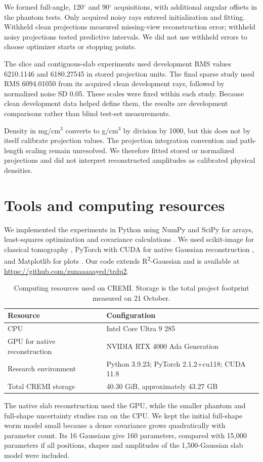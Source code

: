 \documentclass[11pt,a4paper]{article}
\newcommand{\Rtwo}{R\textsuperscript{2}-Gaussian}
\newcommand{\degree}{\ensuremath{^{\circ}}}
\begin{document}
We formed full-angle, 120\degree{} and 90\degree{} acquisitions, with additional angular offsets in the phantom tests. Only acquired noisy rays entered initialization and fitting. Withheld clean projections measured missing-view reconstruction error; withheld noisy projections tested predictive intervals. We did not use withheld errors to choose optimizer starts or stopping points.

The slice and contiguous-slab experiments used development RMS values 6210.1146 and 6180.27545 in stored projection units. The final sparse study used RMS 6094.01050 from its acquired clean development rays, followed by normalized noise SD 0.05. These scales were fixed within each study. Because clean development data helped define them, the results are development comparisons rather than blind test-set measurements.

Density in mg/cm$^3$ converts to g/cm$^3$ by division by 1000, but this does not by itself calibrate projection values. The projection integration convention and path-length scaling remain unresolved. We therefore fitted stored or normalized projections and did not interpret reconstructed amplitudes as calibrated physical densities.

\section{Tools and computing resources}
We implemented the experiments in Python using NumPy and SciPy for arrays, least-squares optimization and covariance calculations \cite{numpy,scipy}. We used scikit-image for classical tomography \cite{skimage}, PyTorch with CUDA for native Gaussian reconstruction \cite{pytorch}, and Matplotlib for plots \cite{matplotlib}. Our code extends \Rtwo{} \cite{r2} and is available at \url{https://github.com/zunaaaaayed/trdp2}.

\begin{table}[H]\centering\small
\caption{Computing resources used on CREMI. Storage is the total project footprint measured on 21 October.}
\begin{tabularx}{\linewidth}{lX}\toprule
Resource & Configuration\\\midrule
CPU & Intel Core Ultra 9 285\\
GPU for native reconstruction & NVIDIA RTX 4000 Ada Generation\\
Research environment & Python 3.9.23; PyTorch 2.1.2+cu118; CUDA 11.8\\
Total CREMI storage & 40.30 GiB, approximately 43.27 GB\\\bottomrule
\end{tabularx}\end{table}
The native slab reconstruction used the GPU, while the smaller phantom and full-shape uncertainty studies ran on the CPU. We kept the initial full-shape worm model small because a dense covariance grows quadratically with parameter count. Its 16 Gaussians give 160 parameters, compared with 15,000 parameters if all positions, shapes and amplitudes of the 1,500-Gaussian slab model were included.
\end{document}
